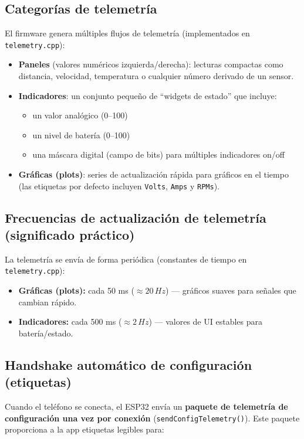 \subsection{Categorías de telemetría}
El firmware genera múltiples flujos de telemetría (implementados en \texttt{telemetry.cpp}):

\begin{itemize}
    \item \textbf{Paneles} (valores numéricos izquierda/derecha): lecturas compactas como distancia, velocidad, temperatura o cualquier número derivado de un sensor.
    \item \textbf{Indicadores}: un conjunto pequeño de ``widgets de estado'' que incluye:
    \begin{itemize}
        \item un valor analógico (0--100)
        \item un nivel de batería (0--100)
        \item una máscara digital (campo de bits) para múltiples indicadores on/off
    \end{itemize}
    \item \textbf{Gráficas (plots)}: series de actualización rápida para gráficos en el tiempo (las etiquetas por defecto incluyen \texttt{Volts}, \texttt{Amps} y \texttt{RPMs}).
\end{itemize}

\subsection{Frecuencias de actualización de telemetría (significado práctico)}
La telemetría se envía de forma periódica (constantes de tiempo en \texttt{telemetry.cpp}):

\begin{itemize}
    \item \textbf{Gráficas (plots):} cada 50 ms (\(\approx 20\,Hz\)) --- gráficos suaves para señales que cambian rápido.
    \item \textbf{Indicadores:} cada 500 ms (\(\approx 2\,Hz\)) --- valores de UI estables para batería/estado.
\end{itemize}

\subsection{Handshake automático de configuración (etiquetas)}
Cuando el teléfono se conecta, el ESP32 envía un \textbf{paquete de telemetría de configuración una vez por conexión}
(\texttt{sendConfigTelemetry()}). Este paquete proporciona a la app etiquetas legibles para:

